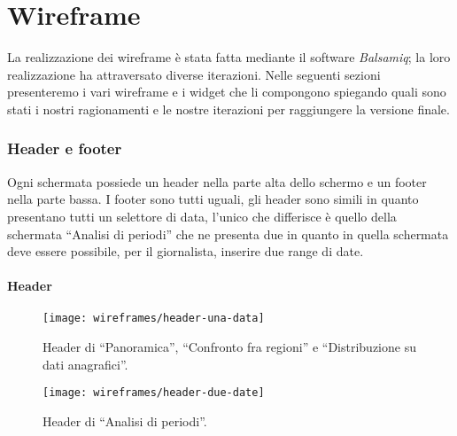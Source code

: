 \section{Wireframe}\label{s:wireframe}
La realizzazione dei wireframe è stata fatta mediante il software \textit{Balsamiq}; la loro realizzazione ha attraversato diverse iterazioni. Nelle seguenti sezioni presenteremo i vari wireframe e i widget che li compongono spiegando quali sono stati i nostri ragionamenti e le nostre iterazioni per raggiungere la versione finale.\\

\subsubsection{Header e footer}\label{ss:header-e-footer}
Ogni schermata possiede un header nella parte alta dello schermo e un footer nella parte bassa. I footer sono tutti uguali, gli header sono simili in quanto presentano tutti un selettore di data, l'unico che differisce è quello della schermata ``Analisi di periodi'' che ne presenta due in quanto in quella schermata deve essere possibile, per il giornalista, inserire due range di date.

\paragraph{Header}
\begin{figure}[H]
    \centering
    \texttt{[image: wireframes/header-una-data]}
    \caption{Header di ``Panoramica'', ``Confronto fra regioni'' e ``Distribuzione su dati anagrafici''.}\label{fig:header-una-data}
\end{figure}

\begin{figure}[H]
    \centering
    \texttt{[image: wireframes/header-due-date]}
    \caption{Header di ``Analisi di periodi''.}\label{fig:header-due-date}
\end{figure}

